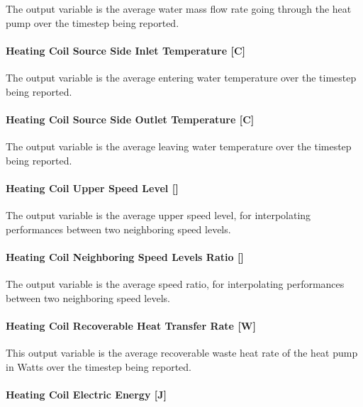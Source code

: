 The output variable is the average water mass flow rate going through the heat pump over the timestep being reported.

\paragraph{Heating Coil Source Side Inlet Temperature {[}C{]}}\label{heating-coil-source-side-inlet-temperature-c-1}

The output variable is the average entering water temperature over the timestep being reported.

\paragraph{Heating Coil Source Side Outlet Temperature {[}C{]}}\label{heating-coil-source-side-outlet-temperature-c-1}

The output variable is the average leaving water temperature over the timestep being reported.

\paragraph{\texorpdfstring{Heating Coil Upper Speed Level {[]}}{Heating Coil Upper Speed Level }}\label{heating-coil-upper-speed-level-1}

The output variable is the average upper speed level, for interpolating performances between two neighboring speed levels.

\paragraph{\texorpdfstring{Heating Coil Neighboring Speed Levels Ratio {[]}}{Heating Coil Neighboring Speed Levels Ratio }}\label{heating-coil-neighboring-speed-levels-ratio-1}

The output variable is the average speed ratio, for interpolating performances between two neighboring speed levels.

\paragraph{Heating Coil Recoverable Heat Transfer Rate {[}W{]}}\label{heating-coil-recoverable-heat-transfer-rate-w}

This output variable is the average recoverable waste heat rate of the heat pump in Watts over the timestep being reported.

\paragraph{Heating Coil Electric Energy {[}J{]}}\label{heating-coil-electric-energy-j-6}

